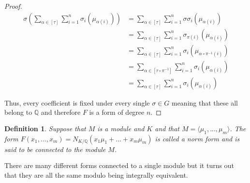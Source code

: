 \documentclass{article}
\newtheorem{definition}{Definition}[section]
\newcommand{\mbb}[1]{\mathbb{#1}}
\numberwithin{equation}{section}
\begin{document}
\begin{proof}
\begin{align*}
    \sigma(\sum_{\alpha \in [\tau]} \sum_{i=1}^n \sigma_i(\mu_{\alpha(i)})) &= \sum_{\alpha \in [\tau]} \sum_{i=1}^n \sigma \sigma_i(\mu_{\alpha(i)})  \\
    &= \sum_{\alpha \in [\tau]} \sum_{i=1}^n \sigma_{\pi(i)}(\mu_{\alpha(i)}) \\
    &= \sum_{\alpha \in [\tau]} \sum_{i=1}^n \sigma_{i}(\mu_{\alpha \circ \pi^{-1}(i)}) \\ 
    &= \sum_{\alpha \in [\tau \circ \pi^{-1}]} \sum_{i=1}^n \sigma_{i}(\mu_{\alpha (i)}) \\
    &= \sum_{\alpha \in [\tau]} \sum_{i=1}^n \sigma_i(\mu_{\alpha(i)})
\end{align*}

Thus, every coefficient is fixed under every single $\sigma \in G$ meaning that these all belong to $\mbb Q$ and therefore $F$ is a form of degree $n$.  
\end{proof}


\begin{definition}
    Suppose that $M$ is a module and $K$ and that $M = \langle \mu_1, ..., \mu_m\rangle$. The form $F(x_1, ..., x_m) = N_{K / \mbb Q}(x_1 \mu_1 + ... + x_m \mu_m)$ is called a norm form and is said to be connected to the module $M$.
\end{definition}
There are many different forms connected to a single module but it turns out that they are all the same modulo being integrally equivalent.
\end{document}

